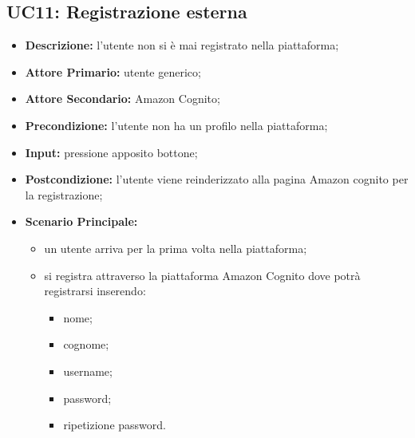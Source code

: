 \subsection{UC11: Registrazione esterna}
\label{sec:UC11}
\begin{itemize}
    \item \textbf{Descrizione:} l'utente non si è mai registrato nella piattaforma;
    \item \textbf{Attore Primario:} utente generico;
    \item \textbf{Attore Secondario:} Amazon Cognito;
    \item \textbf{Precondizione:} l'utente non ha un profilo nella piattaforma;
    \item \textbf{Input:} pressione apposito bottone;
    \item \textbf{Postcondizione:} l'utente viene reinderizzato alla pagina Amazon cognito per la registrazione;
    \item \textbf{Scenario Principale:}
    \begin{itemize}
        \item un utente arriva per la prima volta nella piattaforma;
        \item si registra attraverso la piattaforma Amazon Cognito dove potrà registrarsi inserendo:
        \begin{itemize}
            \item nome;
            \item cognome;
            \item username;
            \item password;
            \item ripetizione password.
        \end{itemize}
    \end{itemize} 
\end{itemize}